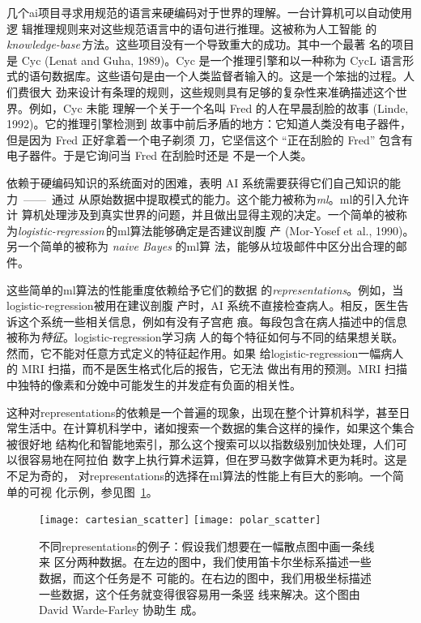 几个\gls*{ai}项目寻求用规范的语言来硬编码对于世界的理解。一台计算机可以自动使用逻
辑推理规则来对这些规范语言中的语句进行推理。这被称为人工智能
的\emph{\gls{knowledge-base}}\,方法。这些项目没有一个导致重大的成功。其中一个最著
名的项目是 Cyc (Lenat and Guha, 1989)。Cyc 是一个推理引擎和以一种称为 CycL 语言形
式的语句数据库。这些语句是由一个人类监督者输入的。这是一个笨拙的过程。人们费很大
劲来设计有条理的规则，这些规则具有足够的复杂性来准确描述这个世界。例如，Cyc 未能
理解一个关于一个名叫 Fred 的人在早晨刮脸的故事 (Linde, 1992)。它的推理引擎检测到
故事中前后矛盾的地方：它知道人类没有电子器件，但是因为 Fred 正好拿着一个电子剃须
刀，它坚信这个 ``正在刮脸的 Fred'' 包含有电子器件。于是它询问当 Fred 在刮脸时还是
不是一个人类。

依赖于硬编码知识的系统面对的困难，表明 AI 系统需要获得它们自己知识的能力~——~通过
从原始数据中提取模式的能力。这个能力被称为\emph{\gls{ml}}。\gls*{ml}的引入允许计
算机处理涉及到真实世界的问题，并且做出显得主观的决定。一个简单的被称
为\emph{\gls{logistic-regression}}\,的\gls*{ml}算法能够确定是否建议剖腹
产 (Mor-Yosef et al., 1990)。另一个简单的被称为 \emph{naive Bayes} 的\gls*{ml}算
法，能够从垃圾邮件中区分出合理的邮件。

这些简单的\gls*{ml}算法的性能重度依赖给予它们的数据
的\emph{\gls{representations}}。例如，当\gls*{logistic-regression}被用在建议剖腹
产时，AI 系统不直接检查病人。相反，医生告诉这个系统一些相关信息，例如有没有子宫疤
痕。每段包含在病人描述中的信息被称为\emph{特征}。\gls*{logistic-regression}学习病
人的每个特征如何与不同的结果想关联。然而，它不能对任意方式定义的特征起作用。如果
给\gls*{logistic-regression}一幅病人的 MRI 扫描，而不是医生格式化后的报告，它无法
做出有用的预测。MRI 扫描中独特的像素和分娩中可能发生的并发症有负面的相关性。

这种对\gls*{representations}的依赖是一个普遍的现象，出现在整个计算机科学，甚至日
常生活中。在计算机科学中，诸如搜索一个数据的集合这样的操作，如果这个集合被很好地
结构化和智能地索引，那么这个搜索可以以指数级别加快处理，人们可以很容易地在阿拉伯
数字上执行算术运算，但在罗马数字做算术更为耗时。这是不足为奇的，
对\gls*{representations}的选择在\gls*{ml}算法的性能上有巨大的影响。一个简单的可视
化示例，参见图~\ref{fig:different_representations}。

\begin{figure}[h]
  \centering
  \texttt{[image: cartesian\_scatter]}
  \texttt{[image: polar\_scatter]}
  \caption{不同\gls*{representations}的例子：假设我们想要在一幅散点图中画一条线来
    区分两种数据。在左边的图中，我们使用笛卡尔坐标系描述一些数据，而这个任务是不
    可能的。在右边的图中，我们用极坐标描述一些数据，这个任务就变得很容易用一条竖
    线来解决。这个图由 David Warde-Farley 协助生
    成。\label{fig:different_representations}}
\end{figure}

